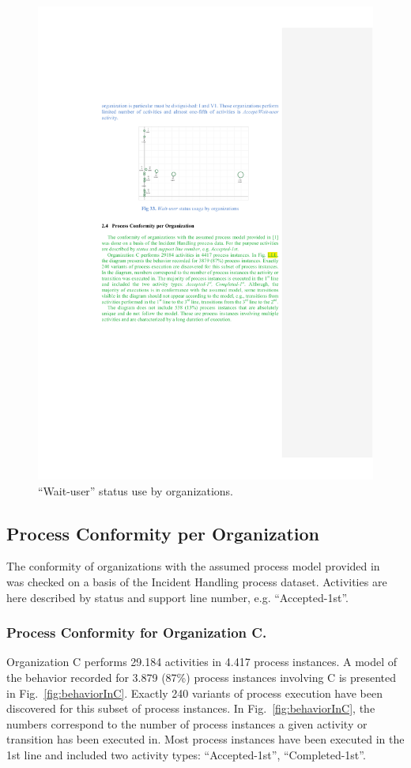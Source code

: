 \documentclass[lnbip]{svmultln}
\begin{document}
\begin{figure}
  \begin{center}
    \includegraphics[width=.6\textwidth]{"figs/pic 35"}
  \end{center}
  \caption{``Wait-user'' status use by organizations.}
  \label{fig:waitUseOrgs}
\end{figure}


\subsection{Process Conformity per Organization}
The conformity of organizations with the assumed process model provided in~\cite{entry1} was checked on a basis of the Incident Handling process dataset. Activities are here described by status and support line number, e.g. ``Accepted-1st''.

\subsubsection{Process Conformity for Organization C.}
Organization C performs 29.184 activities in 4.417 process instances. A model of the behavior recorded for 3.879 (87\%) process instances involving C is presented in Fig.~\ref{fig:behaviorInC}. Exactly 240 variants of process execution have been discovered for this subset of process instances. In Fig.~\ref{fig:behaviorInC}, the numbers correspond to the number of process instances a given activity or transition has been executed in. Most process instances have been executed in the 1st line and included two activity types: ``Accepted-1st'', ``Completed-1st''. 
\end{document}
